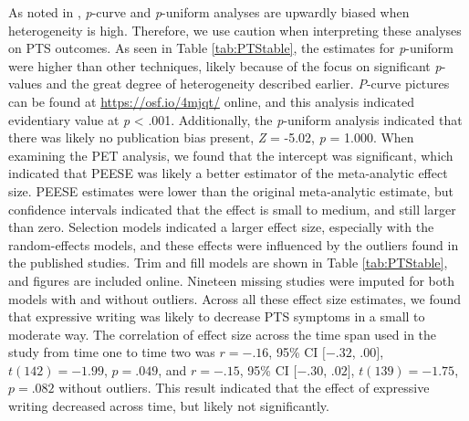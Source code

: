 \documentclass[english,man]{apa6}
\theoremstyle{definition}
\theoremstyle{definition}
\theoremstyle{definition}
\theoremstyle{remark}
\begin{document}
As noted in \textcite{VanAert2016}, \emph{p}-curve and \emph{p}-uniform
analyses are upwardly biased when heterogeneity is high. Therefore, we
use caution when interpreting these analyses on PTS outcomes. As seen in
Table \ref{tab:PTStable}, the estimates for \emph{p}-uniform were higher
than other techniques, likely because of the focus on significant
\emph{p}-values and the great degree of heterogeneity described earlier.
\emph{P}-curve pictures can be found at \url{https://osf.io/4mjqt/}
online, and this analysis indicated evidentiary value at \emph{p}
\textless{} .001. Additionally, the \emph{p}-uniform analysis indicated
that there was likely no publication bias present, \emph{Z} = -5.02,
\emph{p} = 1.000. When examining the PET analysis, we found that the
intercept was significant, which indicated that PEESE was likely a
better estimator of the meta-analytic effect size. PEESE estimates were
lower than the original meta-analytic estimate, but confidence intervals
indicated that the effect is small to medium, and still larger than
zero. Selection models indicated a larger effect size, especially with
the random-effects models, and these effects were influenced by the
outliers found in the published studies. Trim and fill models are shown
in Table \ref{tab:PTStable}, and figures are included online. Nineteen
missing studies were imputed for both models with and without outliers.
Across all these effect size estimates, we found that expressive writing
was likely to decrease PTS symptoms in a small to moderate way. The
correlation of effect size across the time span used in the study from
time one to time two was \(r = -.16\), 95\% CI \([-.32\), \(.00]\),
\(t(142) = -1.99\), \(p = .049\), and \(r = -.15\), 95\% CI \([-.30\),
\(.02]\), \(t(139) = -1.75\), \(p = .082\) without outliers. This result
indicated that the effect of expressive writing decreased across time,
but likely not significantly.
\end{document}
